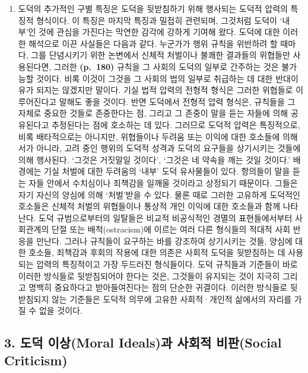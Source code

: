 \begin{enumerate}
\def\labelenumi{(\roman{enumi})}
\setcounter{enumi}{3}
\tightlist
\item
   도덕의 추가적인
  구별 특징은 도덕을 뒷받침하기 위해 행사되는 도덕적 압력의 특징적
  형식이다. 이 특징은 마지막 특징과 밀접히 관련되며, 그것처럼 도덕이
  ‘내부’인 것에 관심을 가진다는 막연한 감각에 강하게 기여해 왔다. 도덕에
  대한 이러한 해석으로 이끈 사실들은 다음과 같다. 누군가가 행위 규칙을
  위반하려 할 때마다, 그를 단념시키기 위한 논변에서  신체적
  처벌이나 불쾌한 결과들의 위협들만 사용된다면, 그러한 \textbf{(p.~180)}
  규칙을 그 사회의 도덕의 일부로 간주하는 것은 불가능할 것이다. 비록
  이것이 그것을 그 사회의 법의 일부로 취급하는 데 대한 반대이유가 되지는
  않겠지만 말이다. 기실 법적 압력의 전형적 형식은 그러한 위협들로
  이루어진다고 말해도 좋을 것이다. 반면 도덕에서 전형적 압력 형식은,
  규칙들을 그 자체로 중요한 것들로 존중한다는 점, 그리고 그 존중이 말을
  듣는 자들에 의해 공유된다고 추정된다는 점에 호소하는 데 있다. 그러므로
  도덕적 압력은 특징적으로, 비록 배타적으로는 아니지만, 위협들이나
  두려움 또는 이익에 대한 호소들에 의해서가 아니라, 고려 중인 행위의
  도덕적 성격과 도덕의 요구들을 상기시키는 것들에 의해 행사된다. ‘그것은
  거짓말일 것이다’, ‘그것은 네 약속을 깨는 것일 것이다.’ 배경에는 기실
  처벌에 대한 두려움의 ‘내부’ 도덕 유사물들이 있다. 항의들이 말을 듣는
  자들 안에서 수치심이나 죄책감을 일깨울 것이라고 상정되기 때문이다.
  그들은 자기 자신의 양심에 의해 ‘처벌’받을 수 있다. 물론 때로 그러한
  고유하게 도덕적인 호소들은 신체적 처벌의 위협들이나 통상적 개인 이익에
  대한 호소들과 함께 나타난다. 도덕 규범으로부터의 일탈들은 비교적
  비공식적인 경멸의 표현들에서부터 사회관계의 단절 또는
  배척(ostracism)에 이르는 여러 다른 형식들의 적대적 사회 반응을 만난다.
  그러나 규칙들이 요구하는 바를 강조하여 상기시키는 것들, 양심에 대한
  호소들, 죄책감과 후회의 작용에 대한 의존은 사회적 도덕을 뒷받침하는 데
  사용되는 압력의 특징적이고 가장 두드러진 형식들이다. 도덕 규칙들과
  기준들이 바로 이러한 방식들로 뒷받침되어야 한다는 것은, 그것들이
  유지되는 것이 지극히 그리고 명백히 중요하다고 받아들여진다는 점의
  단순한 귀결이다. 이러한 방식들로 뒷받침되지 않는 기준들은 도덕적
  의무에 고유한 사회적·개인적 삶에서의 자리를 가질 수 없을 것이다.
\end{enumerate}

\subsection{3. 도덕 이상(Moral Ideals)과 사회적 비판(Social
Criticism)}\label{uxb3c4uxb355-uxc774uxc0c1moral-idealsuxacfc-uxc0acuxd68cuxc801-uxbe44uxd310social-criticism}

